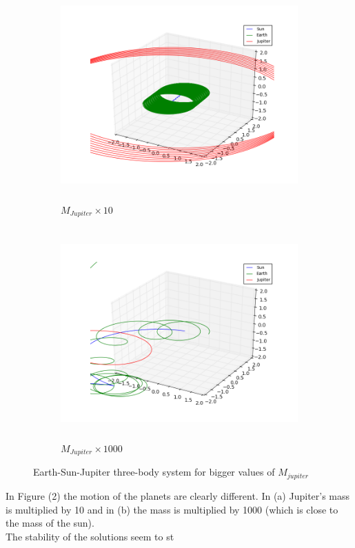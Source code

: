 \documentclass[%
 reprint,
 nobalance,
 amsmath,amssymb,
 aps,
]{revtex4-1}
\begin{document}
 \begin{figure}[t!]	%
     \centering
     \begin{subfigure}[t]{0.5\textwidth}
         \centering
         \includegraphics[height=3.2in]{plot/earth_sun_jupiter_mj10.png}
         \caption{$M_{Jupiter}\times 10$}
     \end{subfigure}
     \begin{subfigure}[t]{0.5\textwidth}
         \centering
         \includegraphics[height=3.2in]{plot/earth_sun_jupiter_mj1000.png}
         \caption{$M_{Jupiter}\times 1000$}
     \end{subfigure}
     \caption{Earth-Sun-Jupiter three-body system for bigger values of $M_{jupiter}$}
 \end{figure}
 
In Figure (2) the motion of the planets are clearly different. In (a) Jupiter's mass is multiplied by 10 and in (b) the mass is multiplied by 1000 (which is close to the mass of the sun).\\
The stability of the solutions seem to st
\end{document}
